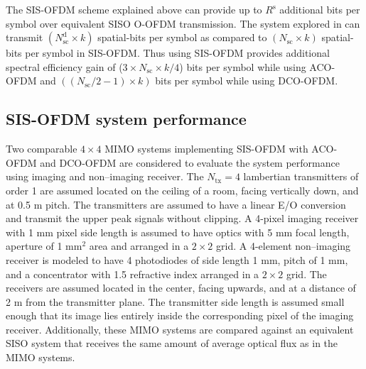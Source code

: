 The SIS-OFDM scheme explained above can provide up to $R^{\text{s}}$ additional bits per symbol over equivalent SISO O-OFDM transmission. The system explored in \cite{zha12a} can transmit $(N_{\text{sc}}^{\text{d}}\times k)$ spatial-bits per symbol as compared to $(N_{\text{sc}}\times k)$ spatial-bits per symbol in SIS-OFDM. Thus using SIS-OFDM provides additional spectral efficiency gain of ($3\times N_{\text{sc}}\times k/4$) bits per symbol while using ACO-OFDM and $((N_{\text{sc}}/2 -1)\times k)$ bits per symbol while using DCO-OFDM.

\subsection{SIS-OFDM system performance}
\label{subsec:sisofdmAnalysis}

Two comparable $4\times 4$ MIMO systems implementing SIS-OFDM with ACO-OFDM and DCO-OFDM are considered to evaluate the system performance using imaging and non--imaging receiver. The $N_{\text{tx}}=4$ lambertian transmitters of order 1 are assumed located on the ceiling of a room, facing vertically down, and at 0.5 m pitch. The transmitters are assumed to have a linear E/O conversion and transmit the upper peak signals without clipping. A 4-pixel imaging receiver with 1 mm pixel side length is assumed to have optics with 5 mm focal length, aperture of 1 mm$^2$ area and arranged in a $2\times 2$ grid. A 4-element non--imaging receiver is modeled to have 4 photodiodes of side length 1 mm, pitch of 1 mm, and a concentrator with 1.5 refractive index arranged in a $2\times 2$ grid. The receivers are assumed located in the center, facing upwards, and at a distance of 2 m from the transmitter plane. The transmitter side length is assumed small enough that its image lies entirely inside the corresponding pixel of the imaging receiver. Additionally, these MIMO systems are compared against an equivalent SISO system that receives the same amount of average optical flux as in the MIMO systems. 


